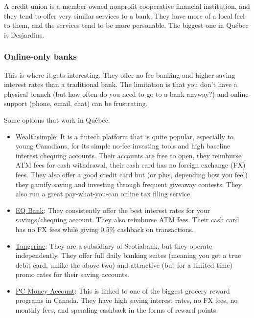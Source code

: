 A credit union is a member-owned nonprofit cooperative financial institution, and they tend to offer very similar services to a bank. They have more of a local feel to them, and the services tend to be more personable. The biggest one in Québec is Desjardins. 

\subsubsection{Online-only banks}

This is where it gets interesting. They offer no fee banking and higher saving interest rates than a traditional bank. The limitation is that you don't have a physical branch (but how often do you need to go to a bank anyway?) and online support (phone, email, chat) can be frustrating.

Some options that work in Québec:
\begin{itemize}
    \item \href{https://www.wealthsimple.com/en-ca}{Wealthsimple}: It is a fintech platform that is quite popular, especially to young Canadians, for its simple no-fee investing tools and high baseline interest chequing accounts. Their accounts are free to open, they reimburse ATM fees for cash withdrawal, their cash card has no foreign exchange (FX) fees. They also offer a good credit card but (or plus, depending how you feel) they gamify saving and investing through frequent giveaway contests. They also run a great pay-what-you-can online tax filing service.
    \item \href{https://www.eqbank.ca/ }{EQ Bank}: They consistently offer the best interest rates for your savings/chequing account. They also reimburse ATM fees. Their cash card has no FX fees while giving 0.5\% cashback on transactions.  
    \item \href{https://www.tangerine.ca/en/personal}{Tangerine}: They are a subsidiary of Scotiabank, but they operate independently. They offer full daily banking suites (meaning you get a true debit card, unlike the above two) and attractive (but for a limited time) promo rates for their saving accounts.
    \item \href{https://www.pcfinancial.ca/en/pc-money-account/}{PC Money Account}: This is linked to one of the biggest grocery reward programs in Canada. They have high saving interest rates, no FX fees, no monthly fees, and spending cashback in the forms of reward points. 
\end{itemize}

